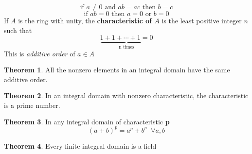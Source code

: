\documentclass[a4paper,12pt]{article}
\theoremstyle{definition}
\theoremstyle{axiom}
\theoremstyle{theorem}
\newtheorem{theorem}{Theorem}[section]
\theoremstyle{lemma}
\begin{document}
\begin{equation}
        \text{if } a \neq 0 \text{ and } ab = ac \text{ then } b = c
\end{equation}
\begin{equation}
        \text{if } ab = 0 \text{ then } a = 0 \text{ or } b = 0
\end{equation}
If $A$ is the ring with unity, the \textbf{characteristic of $A$} is the least positive integer $n$ such that
\begin{equation*}
\underbrace{1 + 1 + \cdots + 1 = 0}_\text{n times}
\end{equation*}
This is \textit{additive order} of $a \in A$
\begin{theorem}{}
    All the nonzero elements in an integral domain have the same additive order.
\end{theorem}
\begin{theorem}{}
    In an integral domain with nonzero characteristic, the characteristic is a prime number.
\end{theorem}
\begin{theorem}{}
    In any integral domain of characteristic \textbf{p}
        \begin{equation*}
                (a+b)^p = a^p + b^p \;\; \forall a,b
        \end{equation*}
\end{theorem}
\begin{theorem}{}
    Every finite integral domain is a field
\end{theorem}
\end{document}
